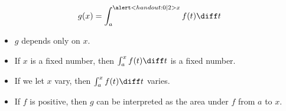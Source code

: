 \begin{frame}
\[
g(x) = \int_a^{\alert<handout:0| 2>{x}}  f(t) \diff t%
\]
\begin{itemize}
\item<2->  $g$ depends only on \alert<handout:0| 2>{$x$}.
\item<3->  If $x$ is a fixed number, then $\int_a^x f(t)\diff t$ is a fixed number.
\item<4->  If we let $x$ vary, then $\int_a^x f(t)\diff t$ varies.
\item<5->  If $f$ is positive, then $g$ can be interpreted as the area under $f$ from $a$ to $x$.
\end{itemize}
\end{frame}
